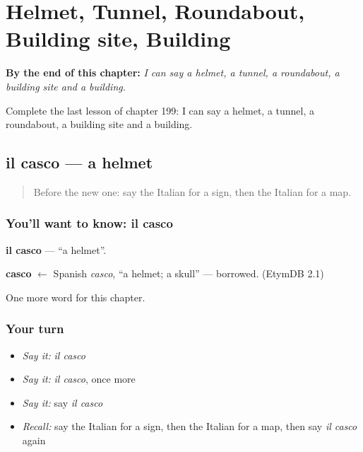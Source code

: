 
\chapter{Helmet, Tunnel, Roundabout, Building site, Building}
\label{ch:it-helmet-tunnel-roundabout-building-site-building}

\begin{chapteropening}
\textbf{By the end of this chapter:} \emph{I can say a helmet, a tunnel, a roundabout, a building site and a building.}

Complete the last lesson of chapter 199: I can say a helmet, a tunnel, a roundabout, a building site and a building.
\end{chapteropening}

\section[il casco]{il casco — a helmet}

\label{lesson:IT-C199-casco}



\begin{quote}
Before the new one: say the Italian for a sign, then the Italian for a map.
\end{quote}

\subsection*{You'll want to know: il casco}
\textbf{il casco} — \textquotedblleft{}a helmet\textquotedblright{}.

\begin{cousinweb}
\textbf{casco} $\leftarrow$ Spanish \emph{casco}, \textquotedblleft{}a helmet; a skull\textquotedblright{} — borrowed. (EtymDB 2.1)
\end{cousinweb}

\begin{grammarlens}[title={What you've built}]
One more word for this chapter.
\end{grammarlens}

\subsection*{Your turn}
\begin{itemize}
\raggedright
  \item \emph{Say it:} \emph{il casco}
  \item \emph{Say it:} \emph{il casco}, once more
  \item \emph{Say it:} say \emph{il casco}
  \item \emph{Recall:} say the Italian for a sign, then the Italian for a map, then say \emph{il casco} again
\end{itemize}

